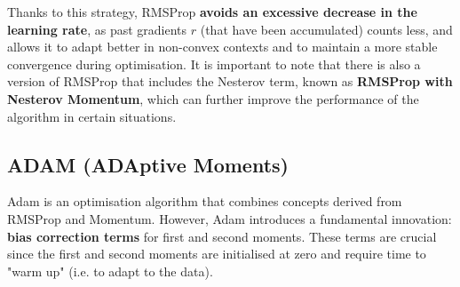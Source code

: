 Thanks to this strategy, RMSProp \textbf{avoids an excessive decrease in the learning rate}, as past gradients $r$ (that have been accumulated) counts less, and allows it to adapt better in non-convex contexts and to maintain a more stable convergence during optimisation. It is important to note that there is also a version of RMSProp that includes the Nesterov term, known as \textbf{RMSProp with Nesterov Momentum}, which can further improve the performance of the algorithm in certain situations.


\subsection{ADAM (ADAptive Moments)}
Adam is an optimisation algorithm that combines concepts derived from RMSProp and Momentum.  However, Adam introduces a fundamental innovation: \textbf{bias correction terms} for first and second moments. These terms are crucial since the first and second moments are initialised at zero and require time to "warm up" (i.e. to adapt to the data).


